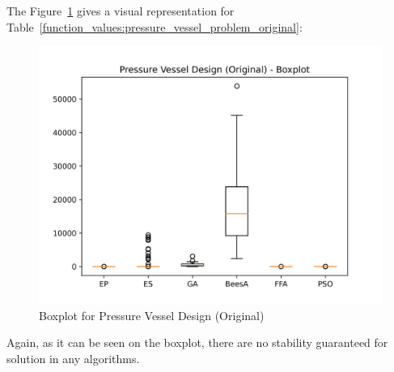 
The Figure~\ref{fig:pressure_vessel_design_original_boxplot} gives a visual representation
for Table~\ref{function_values:pressure_vessel_problem_original}:

\begin{figure}[H]
\centering
\caption{Boxplot for Pressure Vessel Design (Original)}
\label{fig:pressure_vessel_design_original_boxplot}
\includegraphics[scale=0.5]{images/pressure_vessel_problem_original_boxplot.png}
\end{figure}

Again, as it can be seen on the boxplot, there are no stability guaranteed for solution
in any algorithms.

